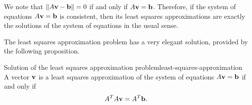 We note that $\norm{A\vect{v}-\vect{b}}=0$ if and only if
$A\vect{v}=\vect{b}$. Therefore, if the system of equations
$A\vect{v}=\vect{b}$ is consistent, then its least squares
approximations are exactly the solutions of the system of equations in
the usual sense.

The least squares approximation problem has a very elegant solution,
provided by the following proposition.

\begin{proposition}{Solution of the least squares approximation problem}{least-squares-approximation}
  A vector $\vect{v}$ is a least squares approximation of the system
  of equations $A\vect{v}=\vect{b}$ if and only if
  \begin{equation*}
    A^TA\vect{v} = A^T\vect{b}.
  \end{equation*}
\end{proposition}


